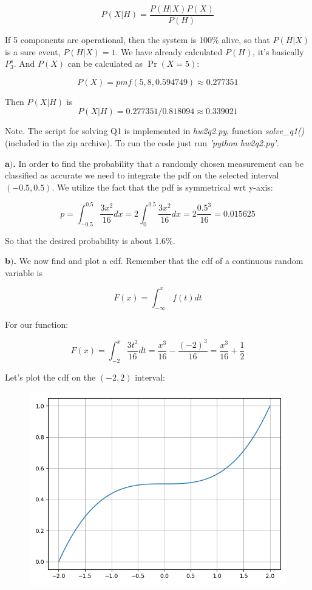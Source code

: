 \documentclass[a4 paper]{article}
\begin{document}
$$
P(X|H)=\frac{P(H|X)P(X)}{P(H)}
$$

If 5 components are operational, then the system is 100\% 
alive, so that $P(H|X)$ is a sure event, $P(H|X)=1$.
We have already calculated $P(H)$, it's basically $P_{3}^{s}$.  
And $P(X)$ can be calculated as $\operatorname{Pr}(X=5)$:

$$
P(X) = pmf(5, 8, 0.594749) \approx 0.277351
$$

Then $P(X|H)$ is
$$
P(X|H) = 0.277351/0.818094 \approx 0.339021
$$ \newline


Note. The script for solving Q1 is implemented in 
\textit{hw2q2.py}, function \textit{solve\_q1()} 
(included in the zip archive). To run the code just run 
\textit{'python hw2q2.py'}. 








\textbf{a$)$.} In order to find 
the probability that a
randomly chosen measurement can be classified as accurate
we need to integrate the pdf on the selected interval $(-0.5,0.5)$.
We utilize the fact that the pdf is symmetrical wrt y-axis:

$$
p=\int_{-0.5}^{0.5}\frac{3x^{2}}{16}dx=2\int_{0}^{0.5}\frac{3x^{2}}{16}dx=2\frac{0.5^{3}}{16}=0.015625
$$

So that the desired probability is about 1.6\%. \newline

\textbf{b$)$.} We now find and plot a cdf. Remember that 
the cdf of a continuous random variable is 

$$
F(x)=\int_{-\infty}^{x} f(t) d t
$$

For our function:

$$
F(x)=\int_{-2}^{x}\frac{3t^{2}}{16}dt=\frac{x^{3}}{16}-\frac{(-2)^{3}}{16}=\frac{x^{3}}{16}+\frac{1}{2}
$$

Let's plot the cdf on the $(-2,2)$ interval:

\begin{figure}[H]
	\includegraphics[scale=0.4]{q2cdf}
	\centering
	\label{q2cdf}
\end{figure}
\end{document}
